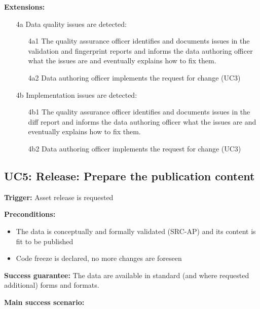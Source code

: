 	\textbf{Extensions:}
	
	\begin{enumerate}
		\item [4a] Data quality issues are detected:
		\begin{enumerate}
			\item [4a1] The quality assurance officer identifies  and documents issues in the validation and fingerprint reports and informs the data authoring officer what the issues are and eventually explains how to fix them.
			\item [4a2] Data authoring officer implements the request for change (UC3)			
		\end{enumerate}
		\item [4b] Implementation issues are detected:
		\begin{enumerate}
			\item [4b1] The quality assurance officer identifies and documents issues in the diff report and informs the data authoring officer what the issues are and eventually explains how to fix them.
			\item [4b2] Data authoring officer implements the request for change (UC3)			
		\end{enumerate}
	\end{enumerate}


	\subsection{UC5: Release: Prepare the publication content}
	\label{sec:uc5}
	\textbf{Trigger:} Asset release is requested
	
	\textbf{Preconditions:} 
	\begin{itemize}
		\item The data is conceptually and formally validated (SRC-AP) and its content is fit to be published
		\item Code freeze is declared, no more changes are foreseen
	\end{itemize}
	
	\textbf{Success guarantee:} The data are available in standard (and where requested additional) forms and formats.
	
	\textbf{Main success scenario:}
	
